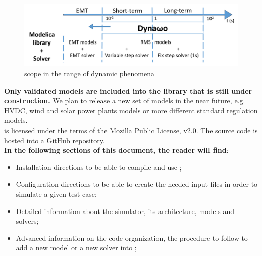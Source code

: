\documentclass[a4paper, 12pt]{report}
\begin{document}
\begin{figure}[h!]
\centering
\includegraphics[width=\textwidth]{../resources/DynawoScope.png}
\caption{\Dynawo scope in the range of dynamic phenomena}
\end{figure}

\textbf{Only validated models are included into the library that is still under
construction.} We plan to release a new set of models in the near future, e.g.
HVDC, wind and solar power plants models or more different standard regulation
models. \\

\Dynawo is licensed under the terms of the \href{http://mozilla.org/MPL/2.0}{\underline{Mozilla Public License, v2.0}}.
The source code is hosted into a \href{https://github.com/dynawo/dynawo} {\underline{GitHub repository}}. \\

\textbf{In the following sections of this document, the reader will find}:
\begin{itemize}
\item Installation directions to be able to compile and use \Dynawo;
\item Configuration directions to be able to create the needed input files in order to simulate a given test case;
\item Detailed information about the \Dynawo simulator, its architecture, models and solvers;
\item Advanced information on the code organization, the procedure to follow to add a new model or a new solver into \Dynawo;
\end{itemize}
\end{document}
